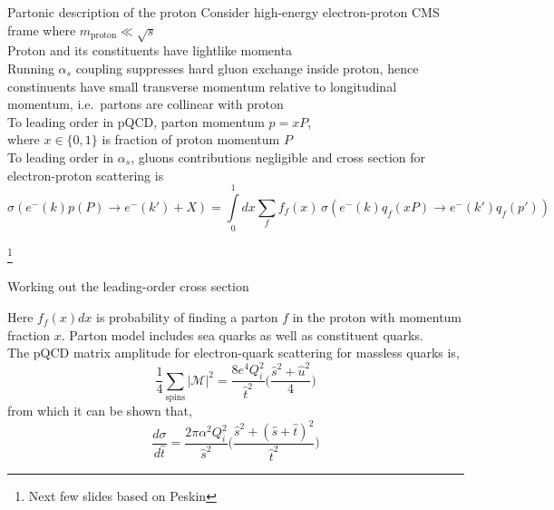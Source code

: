 \documentclass[svgnames]{beamer}
\begin{document}
\begin{frame}{Partonic description of the proton}
Consider high-energy electron-proton CMS frame where $m_\text{proton} \ll \sqrt{s}$ \\
Proton and its constituents have lightlike momenta \bigskip \\
Running $\alpha_s$ coupling suppresses hard gluon exchange inside proton, hence constinuents have small transverse momentum relative to longitudinal momentum, i.e.\ partons are collinear with proton \bigskip \\

To leading order in pQCD, parton momentum $p = x P$, \\
where $x \in \{0, 1\}$ is fraction of proton momentum $P$ \bigskip\\

To leading order in $\alpha_s$, gluons contributions negligible and cross section for electron-proton scattering is
\small
\begin{equation*}
    \sigma(e^-(k) p(P) \rightarrow e^-(k') + X) = \int\limits_0^1 dx \sum\limits_f f_f(x)\, \sigma(e^-(k) q_f(x P) \rightarrow e^-(k') q_f(p'))
\end{equation*}

\footnote{Next few slides based on Peskin}
\end{frame}

\begin{frame}{Working out the leading-order cross section}

Here $f_f(x) dx$ is probability of finding a parton $f$ in the proton with momentum fraction $x$. Parton model includes sea quarks as well as constituent quarks. \bigskip\\

The pQCD matrix amplitude for electron-quark scattering for massless quarks is,
\begin{equation*}
    \frac{1}{4} \sum\limits_\text{spins} |\mathcal{M}|^2 = \frac{8 e^4 Q_i^2}{\hat{t}^2} \Big(\frac{\hat{s}^2 + \hat{u}^2}{4}  \Big)
\end{equation*}
from which it can be shown that,
\begin{equation*}
    \frac{d\sigma}{d\hat{t}} = \frac{2\pi \alpha^2 Q_i^2}{\hat{s}^2} \Big( \frac{\hat{s}^2 + (\hat{s}+\hat{t})^2}{\hat{t}^2} \Big)
\end{equation*}
\end{frame}
\end{document}
